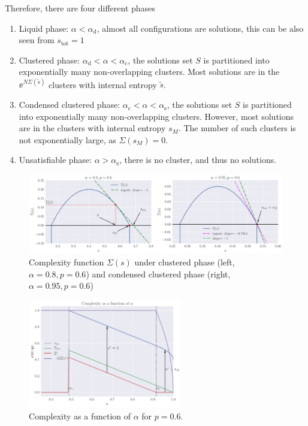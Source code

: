 \documentclass[a4paper,oneside,12pt]{article}
\begin{document}
\begin{solution}
\begin{enumerate}[(a)]
        Therefore, there are four different phases
        \begin{enumerate}[(1)]
        \item   
                Liquid phase: $ \alpha < \alpha_{\mathrm{d}} $, almost all configurations are solutions, this can be also seen from $ s_{\mathrm{tot}} = 1 $
        \item   
                Clustered phase: $ \alpha_{\mathrm{d}} < \alpha < \alpha_{\mathrm{c}} $, the solutions set $ S $ is partitioned into exponentially many non-overlapping clusters.
                Most solutions are in the $ \ee^{N \Sigma(\tilde{s})} $ clusters with internal entropy $ \tilde{s} $.
        \item   
                Condensed clustered phase: $ \alpha_{\mathrm{c}} < \alpha < \alpha_{\mathrm{s}} $, the solutions set $ S $ is partitioned into exponentially many non-overlapping clusters.
                However, most solutions are in the clusters with internal entropy $ s_M $.
                The number of such clusters is not exponentially large, as $ \Sigma(s_M) = 0 $.
        \item   
                Unsatisfiable phase: $ \alpha > \alpha_{\mathrm{s}} $, there is no cluster, and thus no solutions.
        \end{enumerate}
        \begin{figure}[H]
            \centering
            \includegraphics[width=\textwidth]{hw5/hw5_3(c)1.pdf}
            \vspace{-10mm}
            \caption{Complexity function $ \Sigma(s) $ under clustered phase (left, $ \alpha = 0.8, p = 0.6 $) and condensed clustered phase (right, $ \alpha = 0.95, p = 0.6 $)}
        \end{figure}
        \begin{figure}[H]
            \centering
            \includegraphics[width=0.6\textwidth]{hw5/hw5_3(c)2.pdf}
            \caption{Complexity as a function of $ \alpha $ for $ p = 0.6 $.}
        \end{figure}
\end{enumerate}
\end{solution}
\end{document}
